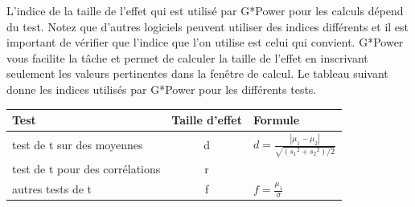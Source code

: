 \documentclass[12pt,]{book}
\begin{document}
L'indice de la taille de l'effet qui est utilisé par G*Power pour les calculs dépend du test.
Notez que d'autres logiciels peuvent utiliser des indices différents et il est important de vérifier que l'indice que l'on utilise est celui qui convient.
G*Power vous facilite la tâche et permet de calculer la taille de l'effet en inscrivant seulement les valeurs pertinentes dans la fenêtre de calcul.
Le tableau suivant donne les indices utilisés par G*Power pour les différents tests.

\begin{longtable}[]{@{}lcl@{}}
\toprule
\begin{minipage}[b]{0.11\columnwidth}\raggedright
Test\strut
\end{minipage} & \begin{minipage}[b]{0.35\columnwidth}\centering
Taille d'effet\strut
\end{minipage} & \begin{minipage}[b]{0.46\columnwidth}\raggedright
Formule\strut
\end{minipage}\tabularnewline
\midrule
\endhead
\begin{minipage}[t]{0.11\columnwidth}\raggedright
test de t sur des moyennes\strut
\end{minipage} & \begin{minipage}[t]{0.35\columnwidth}\centering
d\strut
\end{minipage} & \begin{minipage}[t]{0.46\columnwidth}\raggedright
\(d = \frac{|\mu_1 - \mu_2|}{\sqrt{({s_1}^2 + {s_2}^2)/2}}\)\strut
\end{minipage}\tabularnewline
\begin{minipage}[t]{0.11\columnwidth}\raggedright
test de t pour des corrélations\strut
\end{minipage} & \begin{minipage}[t]{0.35\columnwidth}\centering
r\strut
\end{minipage} & \begin{minipage}[t]{0.46\columnwidth}\raggedright
\strut
\end{minipage}\tabularnewline
\begin{minipage}[t]{0.11\columnwidth}\raggedright
autres tests de t\strut
\end{minipage} & \begin{minipage}[t]{0.35\columnwidth}\centering
f\strut
\end{minipage} & \begin{minipage}[t]{0.46\columnwidth}\raggedright
\(f = \frac{\mu_1}{\sigma}\)\strut

\end{minipage}
\end{longtable}
\end{document}
